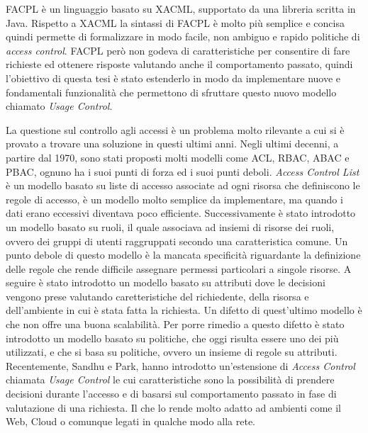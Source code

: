FACPL è un linguaggio basato su XACML, supportato da una libreria scritta in Java. Rispetto a XACML la sintassi di FACPL è molto più semplice e concisa quindi permette di formalizzare in modo facile, non ambiguo e rapido politiche di \textit{access control}. FACPL però non godeva di caratteristiche per consentire di fare richieste ed ottenere risposte valutando anche il comportamento passato, quindi l'obiettivo di questa tesi è stato estenderlo in modo da implementare nuove e fondamentali funzionalità che permettono di sfruttare questo nuovo modello chiamato \textit{Usage Control}. \\ \par
La questione sul controllo agli accessi è un problema molto rilevante a cui si è provato a trovare una soluzione in questi ultimi anni. Negli ultimi decenni, a partire dal 1970, sono stati proposti molti modelli come ACL, RBAC, ABAC e PBAC, ognuno ha i suoi punti di forza ed i suoi punti deboli.
\textit{Access Control List} è un modello basato su liste di accesso associate ad ogni risorsa che definiscono le regole di accesso, è un modello molto semplice da implementare, ma quando i dati erano eccessivi diventava poco efficiente. Successivamente è stato introdotto un modello basato su ruoli, il quale associava ad insiemi di risorse dei ruoli, ovvero dei gruppi di utenti raggruppati secondo una caratteristica comune. Un punto debole di questo modello è la mancata specificità riguardante la definizione delle regole che rende difficile assegnare permessi particolari a singole risorse. A seguire è stato introdotto un modello basato su attributi dove le decisioni vengono prese valutando caretteristiche del richiedente, della risorsa e dell'ambiente in cui è stata fatta la richiesta. Un difetto di quest'ultimo modello è che non offre una buona scalabilità. Per porre rimedio a questo difetto è stato introdotto un modello basato su politiche, che oggi risulta essere uno dei più utilizzati, e che si basa su politiche, ovvero un insieme di regole su attributi.
Recentemente, Sandhu e Park, hanno introdotto un'estensione di \textit{Access Control} chiamata \textit{Usage Control} le cui caratteristiche sono la possibilità di prendere decisioni durante l'accesso e di basarsi sul comportamento passato in fase di valutazione di una richiesta. Il che lo rende molto adatto ad ambienti come il Web, Cloud o comunque legati in qualche modo alla rete. \\ \par
